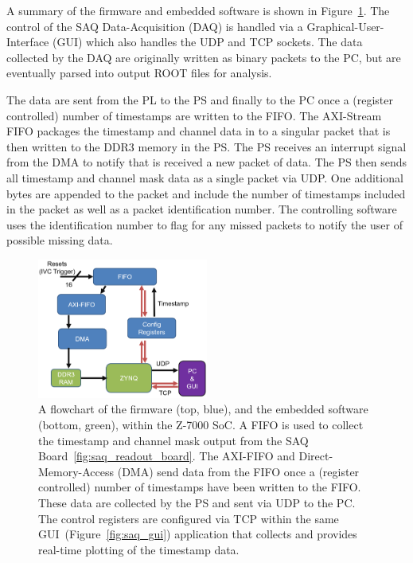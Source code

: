 A summary of the firmware and embedded software is shown in Figure~\ref{fig:saq_firmware}.
The control of the SAQ Data-Acquisition (DAQ) is handled via a Graphical-User-Interface (GUI) which also handles the UDP and TCP sockets.
The data collected by the DAQ are originally written as binary packets to the PC, but are eventually parsed into output ROOT files for analysis.

The data are sent from the PL to the PS and finally to the PC once a (register controlled) number of timestamps are written to the FIFO.
The AXI-Stream FIFO packages the timestamp and channel data in to a singular packet that is then written to the DDR3 memory in the PS.
The PS receives an interrupt signal from the DMA to notify that is received a new packet of data.
The PS then sends all timestamp and channel mask data as a single packet via UDP.
One additional bytes are appended to the packet and include the number of timestamps included in the packet as well as a packet identification number.
The controlling software uses the identification number to flag for any missed packets to notify the user of possible missing data.

\begin{figure}[]
\centering
\includegraphics[width=0.5\textwidth]{images/saq_daq_firmware_summary.png}
\caption{A flowchart of the firmware (top, blue), and the embedded software (bottom, green), within the Z-7000 SoC.
A FIFO is used to collect the timestamp and channel mask output from the SAQ Board~\ref{fig:saq_readout_board}.
The AXI-FIFO and Direct-Memory-Access (DMA) send data from the FIFO once a (register controlled) number of timestamps have been written to the FIFO.
These data are collected by the PS and sent via UDP to the PC.
The control registers are configured via TCP within the same GUI~(Figure~\ref{fig:saq_gui}) application that collects and provides real-time plotting of the timestamp data.
}
\label{fig:saq_firmware}
\end{figure}

